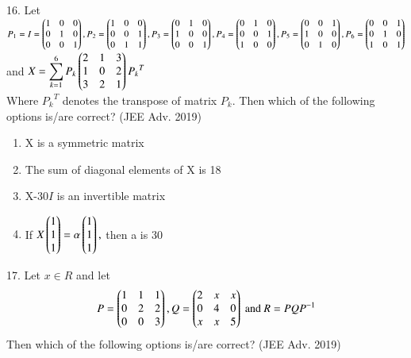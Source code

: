 \documentclass[journal,12pt,twocolumn]{IEEEtran}
\theoremstyle{remark}
\begin{document}
16. Let\\
$
P_1=I=\begin{pmatrix}
    1 & 0 & 0\\
    0 & 1 & 0\\
    0 & 0 & 1
\end{pmatrix}, P_2 = \begin{pmatrix}
    1 & 0 & 0\\
    0 & 0 & 1\\
    0 & 1 & 1
\end{pmatrix}, P_3 = \begin{pmatrix}
    0 & 1 & 0\\
    1 & 0 & 0\\
    0 & 0 & 1
\end{pmatrix}, P_4 = \begin{pmatrix}
    0 & 1 & 0\\
    0 & 0 & 1\\
    1 & 0 & 0
\end{pmatrix}, P_5 = \begin{pmatrix}
    0 & 0 & 1\\
    1 & 0 & 0\\
    0 & 1 & 0
\end{pmatrix}, P_6 = \begin{pmatrix}
    0 & 0 & 1\\
    0 & 1 & 0\\
    1 & 0 & 1
\end{pmatrix}
$ and $\displaystyle X = \sum_{k=1}^{6}P_k\begin{pmatrix}
    2 & 1 & 3\\
    1 & 0 & 2\\
    3 & 2 & 1
\end{pmatrix}{P_k}^T$\\Where ${P_k}^T$ denotes the transpose of matrix $P_k$. Then which of the following options is/are correct? \hfill (JEE Adv. 2019)

\begin{enumerate}
	\item X is a symmetric matrix
	\item The sum of diagonal elements of X is 18
	\item X-30$I$ is an invertible matrix
	\item If $X\begin{pmatrix}1\\1\\1\end{pmatrix}=\alpha\begin{pmatrix}1\\1\\1\end{pmatrix},$ then a is 30\\[2pt]
\end{enumerate}

17. Let $x\in R$ and let
$$P = \begin{pmatrix}1&1&1\\0&2&2\\0&0&3\end{pmatrix},Q = \begin{pmatrix}2&x&x\\0&4&0\\x&x&5\end{pmatrix} \text{ and }R=PQP^{-1}$$
Then which of the following options is/are correct? \hfill (JEE Adv. 2019)
\end{document}
